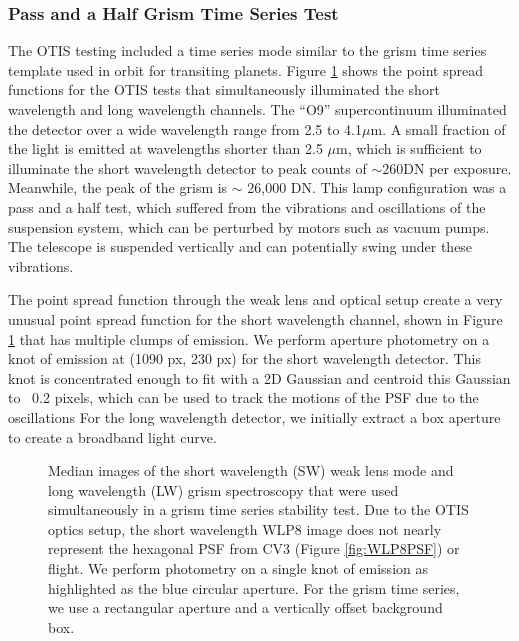 \documentclass{aastex62}
\begin{document}
{\subsubsection{Pass and a Half Grism Time Series Test}
The OTIS testing included a time series mode similar to the grism time series template used in orbit for transiting planets.
Figure \ref{fig:otisPSFs} shows the point spread functions for the OTIS tests that simultaneously illuminated the short wavelength and long wavelength channels.
The ``O9'' supercontinuum illuminated the detector over a wide wavelength range from 2.5 to 4.1$\mu$m.
A small fraction of the light is emitted at wavelengths shorter than 2.5 $\mu$m, which is sufficient to illuminate the short wavelength detector to peak counts of $\sim 260$DN per exposure.
Meanwhile, the peak of the grism is $\sim$ 26,000 DN.
This lamp configuration was a pass and a half test, which suffered from the vibrations and oscillations of the suspension system, which can be perturbed by motors such as vacuum pumps.
The telescope is suspended vertically and can potentially swing under these vibrations.

The point spread function through the weak lens and optical setup create a very unusual point spread function for the short wavelength channel, shown in Figure \ref{fig:otisPSFs} that has multiple clumps of emission.
We perform aperture photometry on a knot of emission at (1090 px, 230 px) for the short wavelength detector.
This knot is concentrated enough to fit with a 2D Gaussian and centroid this Gaussian to ~0.2 pixels, which can be used to track the motions of the PSF due to the oscillations
For the long wavelength detector, we initially extract a box aperture to create a broadband light curve.


\begin{figure}
\caption{Median images of the short wavelength (SW) weak lens mode and long wavelength (LW) grism spectroscopy that were used simultaneously in a grism time series stability test.
Due to the OTIS optics setup, the short wavelength WLP8 image does not nearly represent the hexagonal PSF from CV3 (Figure \ref{fig:WLP8PSF}) or flight.
We perform photometry on a single knot of emission as highlighted as the blue circular aperture.
For the grism time series, we use a rectangular aperture and a vertically offset background box.
}\label{fig:otisPSFs}
\end{figure}

}
\end{document}
